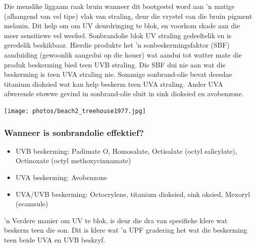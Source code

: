 \label{m38779*id189495}Die menslike liggaam raak bruin wanneer dit bootgestel word aan 'n matige (afhangend van vel tipe) vlak van straling, deur die vrystel van die bruin pigment melanin. Dit help om om UV deurdringing te blok, en voorkom skade aan die meer sensitiewe vel weefsel. Sonbrandolie blok UV straling gedeeltelik en is geredelik beskikbaar. Hierdie produkte het 'n sonbeskermingsfaktor (SBF) aanduiding (gewoonlik aangedui op die houer) wat aandui tot watter mate die produk beskerming bied teen UVB straling. Die SBF dui nie aan wat die beskerming is teen UVA straling nie. Sommige sonbrand-olie bevat deesdae titanium dioksied wat kan help beskerm teen UVA straling. Ander UVA afwerende stowwe gevind in sonbrand-olie sluit in sink dioksied en avobenzone. \par 
\label{m38779*secfhsst!!!underscore!!!id701}
\begin{minipage}{.5\textwidth}
\texttt{[image: photos/beach2\_treehouse1977.jpg]}
\end{minipage}
\begin{minipage}{.5\textwidth}
            \subsubsection*{Wanneer is sonbrandolie effektief?}
            \nopagebreak
        \label{m38779*id189518}\begin{itemize}[noitemsep]
            \label{m38779*uid18}\item UVB beskerming: Padimate O, Homosalate, Octisalate (octyl salicylate), Octinoxate (octyl methoxycinnamate)
\label{m38779*uid19}\item UVA beskerming: Avobenzone
\label{m38779*uid20}\item UVA/UVB beskerming: Octocrylene, titanium dioksied, sink oksied, Mexoryl (ecamsule)
\end{itemize}
        \label{m38779*id189561} 'n Verdere manier om UV te blok, is deur die dra van spesifieke klere wat beskerm teen die son. Dit is klere wat 'n UPF gradering het wat die beskerming teen beide UVA en UVB beskryf. \par 
      \label{m38779*uid21}
\end{minipage}
